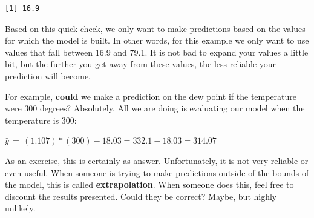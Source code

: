 \documentclass[
  letterpaper,
  DIV=11,
  numbers=noendperiod]{scrreprt}
\begin{document}
\begin{verbatim}
[1] 16.9
\end{verbatim}

Based on this quick check, we only want to make predictions based on the
values for which the model is built. In other words, for this example we
only want to use values that fall between 16.9 and 79.1. It is not bad
to expand your values a little bit, but the further you get away from
these values, the less reliable your prediction will become.

For example, \textbf{could} we make a prediction on the dew point if the
temperature were 300 degrees? Absolutely. All we are doing is evaluating
our model when the temperature is 300:

\(\hat{y} \, = \, (1.107)*(300) - 18.03 = 332.1 - 18.03 = 314.07\)

As an exercise, this is certainly as answer. Unfortunately, it is not
very reliable or even useful. When someone is trying to make predictions
outside of the bounds of the model, this is called
\textbf{extrapolation}. When someone does this, feel free to discount
the results presented. Could they be correct? Maybe, but highly
unlikely.
\end{document}
